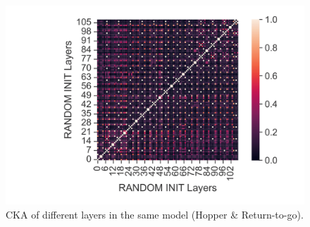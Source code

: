 \documentclass{article}
\begin{document}
\begin{figure}[H]
\begin{minipage}[b]{0.32\linewidth}
    \end{minipage}
    \begin{minipage}[b]{0.32\linewidth}
        \includegraphics[width=\linewidth]{figs/cka_40_40_dtdt_hopper_medium_666_reward.png}
    \end{minipage}
    \caption{CKA of different layers in the same model (Hopper \& Return-to-go).}
\end{figure}
\end{document}
